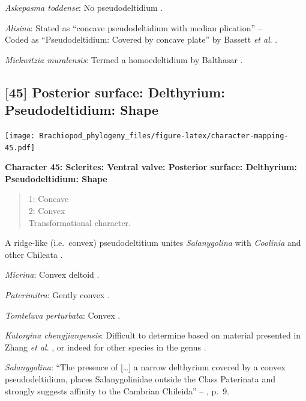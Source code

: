 \documentclass[]{book}
\theoremstyle{definition}
\theoremstyle{definition}
\theoremstyle{definition}
\theoremstyle{remark}
\begin{document}
\emph{Askepasma toddense}: No pseudodeltidium
\citep[p.~153]{Williams2000BrachiopodaLinguliformea}.

\emph{Alisina}: Stated as ``concave pseudodeltidium with median
plication'' -- \citet{Williams2000BrachiopodaLinguliformea}\\
Coded as ``Pseudodeltidium: Covered by concave plate'' by Bassett
\emph{et al}. \citeyearpar{Bassett2001Functionalmorphology}.

\emph{Mickwitzia muralensis}: Termed a homoedeltidium by Balthasar
\citeyearpar{Balthasar2004Shellstructure}.

\hypertarget{posterior-surface-delthyrium-pseudodeltidium-shape}{%
\subsection*{{[}45{]} Posterior surface: Delthyrium: Pseudodeltidium:
Shape}\label{posterior-surface-delthyrium-pseudodeltidium-shape}}

\texttt{[image: Brachiopod\_phylogeny\_files/figure-latex/character-mapping-45.pdf]}

\textbf{Character 45: Sclerites: Ventral valve: Posterior surface:
Delthyrium: Pseudodeltidium: Shape}

\begin{quote}
1: Concave\\
2: Convex\\
Transformational character.
\end{quote}

A ridge-like (i.e.~convex) pseudodeltitium unites \emph{Salanygolina}
with \emph{Coolinia} and other Chileata
\citep[p.~6]{Holmer2009Theenigmatic}.

\emph{Micrina}: Convex deltoid \citep{Holmer2008TheEarly}.

\emph{Paterimitra}: Gently convex \citep[see][fig.
83.1]{Williams2000BrachiopodaLinguliformea}.

\emph{Tomteluva perturbata}: Convex \citep{Streng2016Anew}.

\emph{Kutorgina chengjiangensis}: Difficult to determine based on
material presented in Zhang \emph{et al}.
\citeyearpar{Zhang2007Rhynchonelliformeanbrachiopods}, or indeed for
other species in the genus
\citep[e.g.][]{Williams2000BrachiopodaLinguliformea, Skovsted2005EarlyCambrian, Holmer2018Theattachment}.

\emph{Salanygolina}: ``The presence of {[}\ldots{}{]} a narrow
delthyrium covered by a convex pseudodeltidium, places Salanygolinidae
outside the Class Paterinata and strongly suggests affinity to the
Cambrian Chileida'' -- \citet{Holmer2009Theenigmatic}, p.~9.
\end{document}
